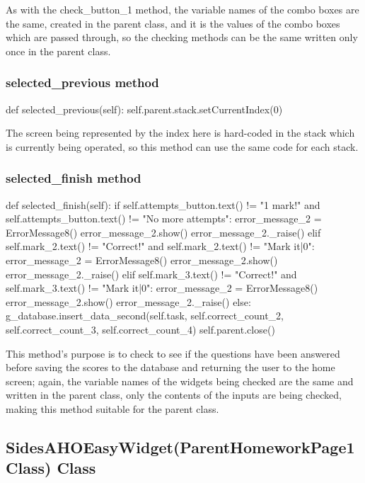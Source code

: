 As with the check\_button\_1 method, the variable names of the combo boxes are the same, created in the parent class, and it is the values of the combo boxes which are passed through, so the checking methods can be the same written only once in the parent class.

\subsubsection{selected\_previous method}

\begin{python}
def selected_previous(self):
        self.parent.stack.setCurrentIndex(0)
\end{python}

The screen being represented by the index here is hard-coded in the stack which is currently being operated, so this method can use the same code for each stack.

\subsubsection{selected\_finish method}

\begin{python}
def selected_finish(self):
        if self.attempts_button.text() != "1 mark!" and self.attempts_button.text() != "No more attempts":
            error_message_2 = ErrorMessage8()
            error_message_2.show()
            error_message_2._raise()
        elif self.mark_2.text() != "Correct!" and self.mark_2.text() != "Mark it|0":
            error_message_2 = ErrorMessage8()
            error_message_2.show()
            error_message_2._raise()
        elif self.mark_3.text() != "Correct!" and self.mark_3.text() != "Mark it|0":
            error_message_2 = ErrorMessage8()
            error_message_2.show()
            error_message_2._raise()
        else:
            g_database.insert_data_second(self.task, self.correct_count_2, self.correct_count_3, self.correct_count_4)
            self.parent.close()
\end{python}

This method's purpose is to check to see if the questions have been answered before saving the scores to the database and returning the user to the home screen; again, the variable names of the widgets being checked are the same and written in the parent class, only the contents of the inputs are being checked, making this method suitable for the parent class.

\subsection{SidesAHOEasyWidget(ParentHomeworkPage1Class) Class}

